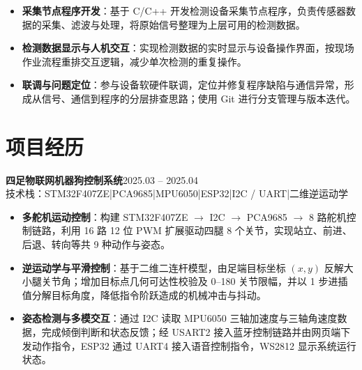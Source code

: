 \documentclass[10pt,a4paper]{article}
\newcommand{\projectblock}[3]{%
    {\bfseries\color{darktext}#1}\hfill{\color{graytext}#2}\\%
    {\small\color{graytext}#3}%
    \vspace{0.15em}%
}
\begin{document}
\vspace{2pt}

\begin{itemize}[leftmargin=1.5em, itemsep=1pt, parsep=0pt, topsep=2pt]
    \item \textbf{采集节点程序开发}：基于 C/C++ 开发检测设备采集节点程序，负责传感器数据的采集、滤波与处理，将原始信号整理为上层可用的检测数据。
    \item \textbf{检测数据显示与人机交互}：实现检测数据的实时显示与设备操作界面，按现场作业流程重排交互逻辑，减少单次检测的重复操作。
    \item \textbf{联调与问题定位}：参与设备软硬件联调，定位并修复程序缺陷与通信异常，形成从信号、通信到程序的分层排查思路；使用 Git 进行分支管理与版本迭代。
\end{itemize}

\vspace{0.2em}

\section{\faProjectDiagram\hspace{0.4em}项目经历}

\projectblock{四足物联网机器狗控制系统}{2025.03 -- 2025.04}{技术栈：STM32F407ZE\hspace{0.3em}|\hspace{0.3em}PCA9685\hspace{0.3em}|\hspace{0.3em}MPU6050\hspace{0.3em}|\hspace{0.3em}ESP32\hspace{0.3em}|\hspace{0.3em}I2C / UART\hspace{0.3em}|\hspace{0.3em}二维逆运动学}

\begin{itemize}[leftmargin=1.5em, itemsep=1pt, parsep=0pt, topsep=2pt]
    \item \textbf{多舵机运动控制}：构建 STM32F407ZE $\rightarrow$ I2C $\rightarrow$ PCA9685 $\rightarrow$ 8 路舵机控制链路，利用 16 路 12 位 PWM 扩展驱动四腿 8 个关节，实现站立、前进、后退、转向等共 9 种动作与姿态。
    \item \textbf{逆运动学与平滑控制}：基于二维二连杆模型，由足端目标坐标 $(x, y)$ 反解大小腿关节角；增加目标点几何可达性校验及 0\textdegree--180\textdegree{} 关节限幅，并以 1\textdegree{} 步进插值分解目标角度，降低指令阶跃造成的机械冲击与抖动。
    \item \textbf{姿态检测与多模交互}：通过 I2C 读取 MPU6050 三轴加速度与三轴角速度数据，完成倾倒判断和状态反馈；经 USART2 接入蓝牙控制链路并由网页端下发动作指令，ESP32 通过 UART4 接入语音控制指令，WS2812 显示系统运行状态。
\end{itemize}
\end{document}
